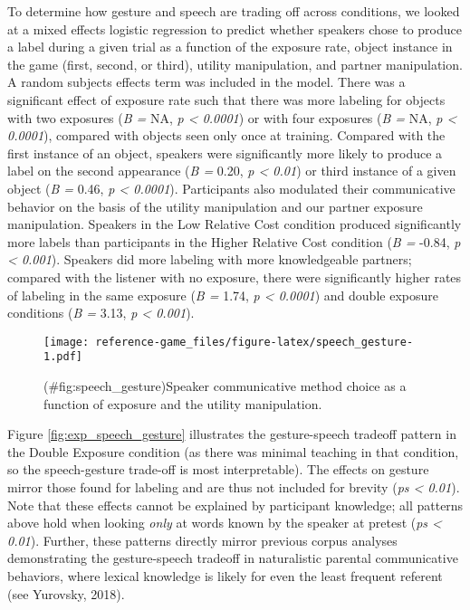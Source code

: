 \documentclass[english,,man,floatsintext]{apa6}
\begin{document}
To determine how gesture and speech are trading off across conditions, we looked at a mixed effects logistic regression to predict whether speakers chose to produce a label during a given trial as a function of the exposure rate, object instance in the game (first, second, or third), utility manipulation, and partner manipulation. A random subjects effects term was included in the model. There was a significant effect of exposure rate such that there was more labeling for objects with two exposures (\emph{B =} NA, \emph{p \textless{} 0.0001}) or with four exposures (\emph{B =} NA, \emph{p \textless{} 0.0001}), compared with objects seen only once at training. Compared with the first instance of an object, speakers were significantly more likely to produce a label on the second appearance (\emph{B =} 0.20, \emph{p \textless{} 0.01}) or third instance of a given object (\emph{B =} 0.46, \emph{p \textless{} 0.0001}). Participants also modulated their communicative behavior on the basis of the utility manipulation and our partner exposure manipulation. Speakers in the Low Relative Cost condition produced significantly more labels than participants in the Higher Relative Cost condition (\emph{B =} -0.84, \emph{p \textless{} 0.001}). Speakers did more labeling with more knowledgeable partners; compared with the listener with no exposure, there were significantly higher rates of labeling in the same exposure (\emph{B =} 1.74, \emph{p \textless{} 0.0001}) and double exposure conditions (\emph{B =} 3.13, \emph{p \textless{} 0.001}).

\begin{figure}
\centering
\texttt{[image: reference-game\_files/figure-latex/speech\_gesture-1.pdf]}
\caption{(\#fig:speech\_gesture)Speaker communicative method choice as a function of exposure and the utility manipulation.}
\end{figure}

Figure \ref{fig:exp_speech_gesture} illustrates the gesture-speech tradeoff pattern in the Double Exposure condition (as there was minimal teaching in that condition, so the speech-gesture trade-off is most interpretable). The effects on gesture mirror those found for labeling and are thus not included for brevity (\emph{ps \textless{} 0.01}). Note that these effects cannot be explained by participant knowledge; all patterns above hold when looking \emph{only} at words known by the speaker at pretest (\emph{ps \textless{} 0.01}). Further, these patterns directly mirror previous corpus analyses demonstrating the gesture-speech tradeoff in naturalistic parental communicative behaviors, where lexical knowledge is likely for even the least frequent referent (see Yurovsky, 2018).
\end{document}
